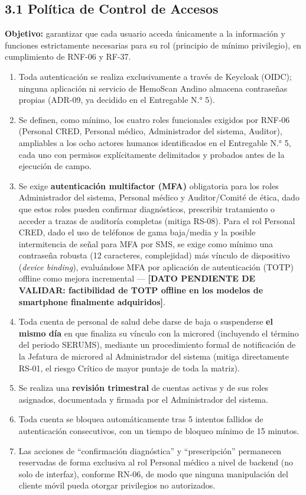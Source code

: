 \documentclass[11pt,a4paper]{article}
\providecommand{\tightlist}{%
  \setlength{\itemsep}{0pt}\setlength{\parskip}{0pt}}
\begin{document}
\subsection{3.1 Política de Control de Accesos}\label{poluxedtica-de-control-de-accesos}

\textbf{Objetivo:} garantizar que cada usuario acceda únicamente a la información y funciones estrictamente necesarias para su rol (principio de mínimo privilegio), en cumplimiento de RNF-06 y RF-37.

\begin{enumerate}
\def\labelenumi{\arabic{enumi}.}
\tightlist
\item
  Toda autenticación se realiza exclusivamente a través de Keycloak (OIDC); ninguna aplicación ni servicio de HemoScan Andino almacena contraseñas propias (ADR-09, ya decidido en el Entregable N.° 5).
\item
  Se definen, como mínimo, los cuatro roles funcionales exigidos por RNF-06 (Personal CRED, Personal médico, Administrador del sistema, Auditor), ampliables a los ocho actores humanos identificados en el Entregable N.° 5, cada uno con permisos explícitamente delimitados y probados antes de la ejecución de campo.
\item
  Se exige \textbf{autenticación multifactor (MFA)} obligatoria para los roles Administrador del sistema, Personal médico y Auditor/Comité de ética, dado que estos roles pueden confirmar diagnósticos, prescribir tratamiento o acceder a trazas de auditoría completas (mitiga RS-08). Para el rol Personal CRED, dado el uso de teléfonos de gama baja/media y la posible intermitencia de señal para MFA por SMS, se exige como mínimo una contraseña robusta (12 caracteres, complejidad) más vínculo de dispositivo (\emph{device binding}), evaluándose MFA por aplicación de autenticación (TOTP) offline como mejora incremental --- \textbf{{[}DATO PENDIENTE DE VALIDAR: factibilidad de TOTP offline en los modelos de smartphone finalmente adquiridos{]}}.
\item
  Toda cuenta de personal de salud debe darse de baja o suspenderse \textbf{el mismo día} en que finaliza su vínculo con la microred (incluyendo el término del periodo SERUMS), mediante un procedimiento formal de notificación de la Jefatura de microred al Administrador del sistema (mitiga directamente RS-01, el riesgo Crítico de mayor puntaje de toda la matriz).
\item
  Se realiza una \textbf{revisión trimestral} de cuentas activas y de sus roles asignados, documentada y firmada por el Administrador del sistema.
\item
  Toda cuenta se bloquea automáticamente tras 5 intentos fallidos de autenticación consecutivos, con un tiempo de bloqueo mínimo de 15 minutos.
\item
  Las acciones de ``confirmación diagnóstica'' y ``prescripción'' permanecen reservadas de forma exclusiva al rol Personal médico a nivel de backend (no solo de interfaz), conforme RN-06, de modo que ninguna manipulación del cliente móvil pueda otorgar privilegios no autorizados.
\end{enumerate}
\end{document}
